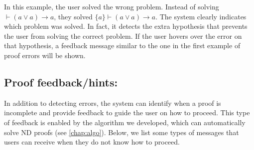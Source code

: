 \begin{center}
\end{center}

In this example, the user solved the wrong problem. Instead of solving \(\vdash (a \lor a) \to a\), they solved \(\{a\} \vdash (a \lor a) \to a\). The system clearly indicates which problem was solved. In fact, it detects the extra hypothesis that prevents the user from solving the correct problem. If the user hovers over the error on that hypothesis, a feedback message similar to the one in the first example of proof errors will be shown.
\begin{center}
\end{center}

\subsection{Proof feedback/hints:}
In addition to detecting errors, the system can identify when a proof is incomplete and provide feedback to guide the user on how to proceed. This type of feedback is enabled by the algorithm we developed, which can automatically solve \gls{ND} proofs (see \autoref{chap:algo}). Below, we list some types of messages that users can receive when they do not know how to proceed.

